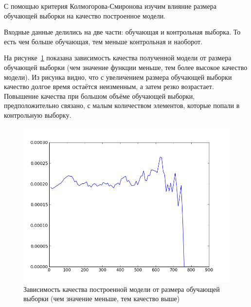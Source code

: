 \documentclass[12pt,a4paper,oneside]{extarticle}
\begin{document}
    С помощью критерия Колмогорова-Смиронова изучим влияние размера обучающей выборки на качество построенное модели. 

    Входные данные делились на две части: обучающая и контрольная выборка. То есть чем больше обучающая, тем меньше контрольная и наоборот.

    На рисунке~\ref{pic:test} показана зависимость качества полученной модели от размера обучающей выборки (чем значение функции меньше, тем более высокое качество модели). Из рисунка видно, что с увеличением размера обучающей выборки качество долгое время остаётся неизменным, а затем резко возрастает. Повышение качества при большом объёме обучающей выборки, предположительно связано, с малым количеством элементов, которые попали в контрольную выборку.

    \begin{figure}[h!]
        \center
        \includegraphics[scale=0.7]{../kolmogorov.png}
        \caption{Зависимость качества построенной модели от размера обучающей выборки (чем значение меньше, тем качество выше)}
        \label{pic:test}
    \end{figure}
\end{document}

